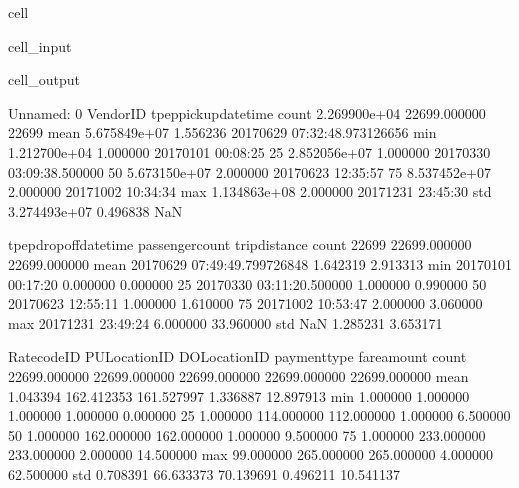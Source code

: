 \documentclass[letterpaper,10pt,english]{sphinxmanual}
\begin{document}
\begin{sphinxuseclass}{cell}
\begin{sphinxuseclass}{cell_input}
\begin{sphinxVerbatim}[commandchars=\\\{\}]
\end{sphinxVerbatim}

\end{sphinxuseclass}
\begin{sphinxuseclass}{cell_output}
\begin{sphinxVerbatim}[commandchars=\\\{\}]
         Unnamed: 0      VendorID           tpep\PYGZus{}pickup\PYGZus{}datetime  \PYGZbs{}
count  2.269900e+04  22699.000000                          22699   
mean   5.675849e+07      1.556236  2017\PYGZhy{}06\PYGZhy{}29 07:32:48.973126656   
min    1.212700e+04      1.000000            2017\PYGZhy{}01\PYGZhy{}01 00:08:25   
25\PYGZpc{}    2.852056e+07      1.000000     2017\PYGZhy{}03\PYGZhy{}30 03:09:38.500000   
50\PYGZpc{}    5.673150e+07      2.000000            2017\PYGZhy{}06\PYGZhy{}23 12:35:57   
75\PYGZpc{}    8.537452e+07      2.000000            2017\PYGZhy{}10\PYGZhy{}02 10:34:34   
max    1.134863e+08      2.000000            2017\PYGZhy{}12\PYGZhy{}31 23:45:30   
std    3.274493e+07      0.496838                            NaN   

               tpep\PYGZus{}dropoff\PYGZus{}datetime  passenger\PYGZus{}count  trip\PYGZus{}distance  \PYGZbs{}
count                          22699     22699.000000   22699.000000   
mean   2017\PYGZhy{}06\PYGZhy{}29 07:49:49.799726848         1.642319       2.913313   
min              2017\PYGZhy{}01\PYGZhy{}01 00:17:20         0.000000       0.000000   
25\PYGZpc{}       2017\PYGZhy{}03\PYGZhy{}30 03:11:20.500000         1.000000       0.990000   
50\PYGZpc{}              2017\PYGZhy{}06\PYGZhy{}23 12:55:11         1.000000       1.610000   
75\PYGZpc{}              2017\PYGZhy{}10\PYGZhy{}02 10:53:47         2.000000       3.060000   
max              2017\PYGZhy{}12\PYGZhy{}31 23:49:24         6.000000      33.960000   
std                              NaN         1.285231       3.653171   

         RatecodeID  PULocationID  DOLocationID  payment\PYGZus{}type   fare\PYGZus{}amount  \PYGZbs{}
count  22699.000000  22699.000000  22699.000000  22699.000000  22699.000000   
mean       1.043394    162.412353    161.527997      1.336887     12.897913   
min        1.000000      1.000000      1.000000      1.000000      0.000000   
25\PYGZpc{}        1.000000    114.000000    112.000000      1.000000      6.500000   
50\PYGZpc{}        1.000000    162.000000    162.000000      1.000000      9.500000   
75\PYGZpc{}        1.000000    233.000000    233.000000      2.000000     14.500000   
max       99.000000    265.000000    265.000000      4.000000     62.500000   
std        0.708391     66.633373     70.139691      0.496211     10.541137   


\end{sphinxVerbatim}
\end{sphinxuseclass}
\end{sphinxuseclass}
\end{document}
